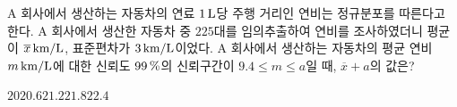 A 회사에서 생산하는 자동차의 연료 $1\mkern3mu \mathrm{L}$당 주행 거리인 연비는 정규분포를 따른다고 한다. A 회사에서 생산한 자동차 중 $225$대를 임의추출하여 연비를 조사하였더니 평균이 $\overline{x}\mkern3mu \mathrm{km/L}$, 표준편차가 $3\mkern3mu \mathrm{km/L}$이었다. A 회사에서 생산하는 자동차의 평균 연비 $m\mkern3mu \mathrm{km/L}$에 대한 신뢰도 $99\mkern3mu \%$의 신뢰구간이 $9.4\le m\le a$일 때, $\overline{x}+a$의 값은? 
\begin{choices32}{$20$}{$20.6$}{$21.2$}{$21.8$}{$22.4$}\end{choices32}
